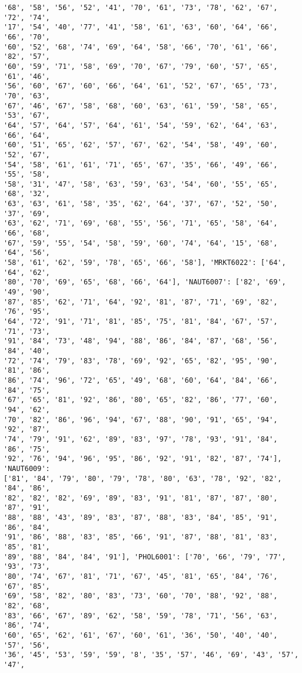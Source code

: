 \documentclass[11pt]{article}
\begin{document}
\begin{Verbatim}[commandchars=\\\{\}]
'68', '58', '56', '52', '41', '70', '61', '73', '78', '62', '67', '72', '74',
'17', '54', '40', '77', '41', '58', '61', '63', '60', '64', '66', '66', '70',
'60', '52', '68', '74', '69', '64', '58', '66', '70', '61', '66', '82', '57',
'60', '59', '71', '58', '69', '70', '67', '79', '60', '57', '65', '61', '46',
'56', '60', '67', '60', '66', '64', '61', '52', '67', '65', '73', '70', '63',
'67', '46', '67', '58', '68', '60', '63', '61', '59', '58', '65', '53', '67',
'64', '57', '64', '57', '64', '61', '54', '59', '62', '64', '63', '66', '64',
'60', '51', '65', '62', '57', '67', '62', '54', '58', '49', '60', '52', '67',
'54', '58', '61', '61', '71', '65', '67', '35', '66', '49', '66', '55', '58',
'58', '31', '47', '58', '63', '59', '63', '54', '60', '55', '65', '68', '32',
'63', '63', '61', '58', '35', '62', '64', '37', '67', '52', '50', '37', '69',
'63', '62', '71', '69', '68', '55', '56', '71', '65', '58', '64', '66', '68',
'67', '59', '55', '54', '58', '59', '60', '74', '64', '15', '68', '64', '56',
'58', '61', '62', '59', '78', '65', '66', '58'], 'MRKT6022': ['64', '64', '62',
'80', '70', '69', '65', '68', '66', '64'], 'NAUT6007': ['82', '69', '49', '90',
'87', '85', '62', '71', '64', '92', '81', '87', '71', '69', '82', '76', '95',
'64', '72', '91', '71', '81', '85', '75', '81', '84', '67', '57', '71', '73',
'91', '84', '73', '48', '94', '88', '86', '84', '87', '68', '56', '84', '40',
'72', '74', '79', '83', '78', '69', '92', '65', '82', '95', '90', '81', '86',
'86', '74', '96', '72', '65', '49', '68', '60', '64', '84', '66', '84', '75',
'67', '65', '81', '92', '86', '80', '65', '82', '86', '77', '60', '94', '62',
'70', '82', '86', '96', '94', '67', '88', '90', '91', '65', '94', '92', '87',
'74', '79', '91', '62', '89', '83', '97', '78', '93', '91', '84', '86', '75',
'92', '76', '94', '96', '95', '86', '92', '91', '82', '87', '74'], 'NAUT6009':
['81', '84', '79', '80', '79', '78', '80', '63', '78', '92', '82', '84', '86',
'82', '82', '82', '69', '89', '83', '91', '81', '87', '87', '80', '87', '91',
'88', '88', '43', '89', '83', '87', '88', '83', '84', '85', '91', '86', '84',
'91', '86', '88', '83', '85', '66', '91', '87', '88', '81', '83', '85', '81',
'89', '88', '84', '84', '91'], 'PHOL6001': ['70', '66', '79', '77', '93', '73',
'80', '74', '67', '81', '71', '67', '45', '81', '65', '84', '76', '67', '85',
'69', '58', '82', '80', '83', '73', '60', '70', '88', '92', '88', '82', '68',
'83', '66', '67', '89', '62', '58', '59', '78', '71', '56', '63', '86', '74',
'60', '65', '62', '61', '67', '60', '61', '36', '50', '40', '40', '57', '56',
'36', '45', '53', '59', '59', '8', '35', '57', '46', '69', '43', '57', '47',

\end{Verbatim}
\end{document}
